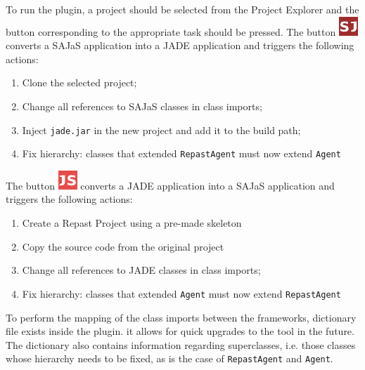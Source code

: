 To run the plugin, a project should be selected from the Project Explorer and the button corresponding to the appropriate task should be pressed. The button \includegraphics[scale=1.0]{figures/sj.pdf} converts a SAJaS application into a JADE application and triggers the following actions:

\begin{samepage}
\begin{enumerate}
  \item Clone the selected project;
  \item Change all references to SAJaS classes in class imports;
  \item Inject \texttt{jade.jar} in the new project and add it to the build path;
  \item Fix hierarchy: classes that extended \texttt{RepastAgent} must now extend \texttt{Agent}
\end{enumerate}
\end{samepage}

The button \includegraphics[scale=1.0]{figures/js.pdf} converts a JADE application into a SAJaS application and triggers the following actions:

\begin{samepage}
\begin{enumerate}
  \item Create a Repast Project using a pre-made skeleton
  \item Copy the source code from the original project
  \item Change all references to JADE classes in class imports;
  \item Fix hierarchy: classes that extended \texttt{Agent} must now extend \texttt{RepastAgent}
\end{enumerate}
\end{samepage}

To perform the mapping of the class imports between the frameworks, dictionary file exists inside the plugin. it allows for quick upgrades to the tool in the future. The dictionary also contains information regarding superclasses, i.e. those classes whose hierarchy needs to be fixed, as is the case of \texttt{RepastAgent} and \texttt{Agent}.